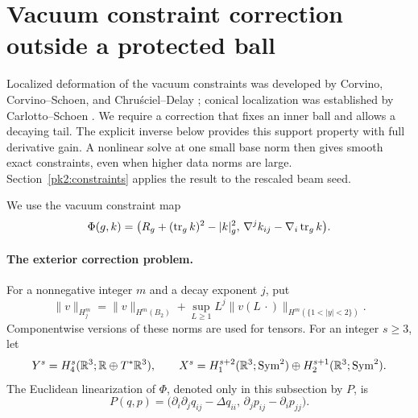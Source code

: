 \section{Vacuum constraint correction outside a protected ball}
\label{pk:constraints}

Localized deformation of the vacuum constraints was developed by
Corvino, Corvino--Schoen, and Chru\'sciel--Delay
\cite{Corvino2000,CorvinoSchoen2006,ChruscielDelay2003}; conical localization
was established by Carlotto--Schoen \cite{CarlottoSchoen2016}. We require a
correction that fixes an inner ball and allows a decaying tail. The
explicit inverse below provides this support property with full
derivative gain. A nonlinear solve at one small base norm then gives
smooth exact constraints, even when higher data norms are large.
Section~\ref{pk2:constraints} applies the result to the rescaled beam
seed.

We use the vacuum constraint map
\[
 \Phi(g,k)=
 \bigl(R_g+(\operatorname{tr}_g k)^2-|k|_g^2,\,
       \nabla^j k_{ij}-\nabla_i\operatorname{tr}_g k\bigr).
\]
\paragraph{The exterior correction problem.}
For a nonnegative integer \(m\) and a decay exponent \(j\), put
\begin{equation}
 \|v\|_{H^m_j}
  =\|v\|_{H^m(B_2)}
   +\sup_{L\geq1} L^j
      \|v(L\,\cdot)\|_{H^m(\{1<|y|<2\})}.
 \label{pk:constraint-spaces}
\end{equation}
Componentwise versions of these norms are used for tensors.  For an
integer \(s\geq3\), let
\[
 Y^s=H^s_4(\mathbb R^3;\mathbb R\oplus T^*\mathbb R^3),\qquad
 X^s=H^{s+2}_1(\mathbb R^3;\operatorname{Sym}^2)
       \oplus H^{s+1}_2(\mathbb R^3;\operatorname{Sym}^2).
\]
The Euclidean linearization of \(\Phi\), denoted only in this subsection
by \(P\), is
\begin{equation}
 P(q,p)=
 \bigl(\partial_i\partial_jq_{ij}-\Delta q_{ii},\,
       \partial_jp_{ij}-\partial_i p_{jj}\bigr).
 \label{pk:constraint-P}
\end{equation}

